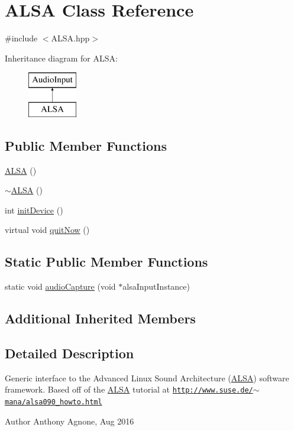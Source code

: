 \hypertarget{classALSA}{}\section{A\+L\+SA Class Reference}
\label{classALSA}


{\ttfamily \#include $<$A\+L\+S\+A.\+hpp$>$}

Inheritance diagram for A\+L\+SA\+:\begin{figure}[H]
\begin{center}
\leavevmode
\includegraphics[height=2.000000cm]{classALSA}
\end{center}
\end{figure}
\subsection*{Public Member Functions}
\begin{DoxyCompactItemize}
\item 
\hyperlink{classALSA_a7523f4f0edec34cf75a3fa2197f70a03}{A\+L\+SA} ()
\item 
\hyperlink{classALSA_a80e4d6d916fd10a25e6c54da0f43af0d}{$\sim$\+A\+L\+SA} ()
\item 
int \hyperlink{classALSA_a875434b9aa77a5c72fa8bb5e6d7e6e82}{init\+Device} ()
\item 
virtual void \hyperlink{classALSA_a69dea83cc1785dd4c88bd1a9a02ac4b3}{quit\+Now} ()
\end{DoxyCompactItemize}
\subsection*{Static Public Member Functions}
\begin{DoxyCompactItemize}
\item 
static void \hyperlink{classALSA_a3a3015c0dcdc2cdf1a9527fb6ffe5bc7}{audio\+Capture} (void $\ast$alsa\+Input\+Instance)
\end{DoxyCompactItemize}
\subsection*{Additional Inherited Members}


\subsection{Detailed Description}
Generic interface to the Advanced Linux Sound Architecture (\hyperlink{classALSA}{A\+L\+SA}) software framework. Based off of the \hyperlink{classALSA}{A\+L\+SA} tutorial at \href{http://www.suse.de/~mana/alsa090_howto.html}{\tt http\+://www.\+suse.\+de/$\sim$mana/alsa090\+\_\+howto.\+html} \begin{DoxyAuthor}{Author}
Anthony Agnone, Aug 2016 
\end{DoxyAuthor}


